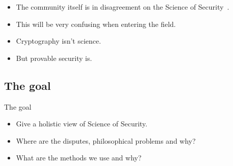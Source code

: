 \begin{frame}
  \begin{remark}
    \begin{itemize}
      \item The community itself is in disagreement on the Science of 
        Security~\cite{SecurityAsAScience}.
      \item This will be very confusing when entering the field.
    \end{itemize}
  \end{remark}

  \pause

  \begin{example}
    \begin{itemize}
      \item Cryptography isn't science.
      \item But provable security is.
    \end{itemize}
  \end{example}
\end{frame}

\begin{frame}
\end{frame}


\subsection{The goal}

\begin{frame}
  \begin{block}{The goal}
    \begin{itemize}
      \item Give a holistic view of Science of Security.

        \pause

      \item Where are the disputes, philosophical problems and why?
      \item What are the methods we use and why?
    \end{itemize}
  \end{block}
\end{frame}

